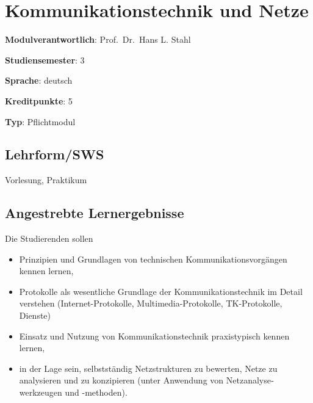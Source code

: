 \hypertarget{kommunikationstechnik-und-netzepathlabelmi-2017modulbeschreibungen-bachelorba_kommunikationstechnikundnetze}{%
\chapter{Kommunikationstechnik und
Netze\label{/mi-2017/modulbeschreibungen-bachelor/BA_KommunikationstechnikundNetze}}\label{kommunikationstechnik-und-netzepathlabelmi-2017modulbeschreibungen-bachelorba_kommunikationstechnikundnetze}}

\begin{modulHead}
\textbf{Modulverantwortlich}: Prof.~Dr.~Hans L.
Stahl
\end{modulHead}
\begin{modulHead}
\textbf{Studiensemester}:
3
\end{modulHead}
\begin{modulHead}
\textbf{Sprache}:
deutsch
\end{modulHead}
\begin{modulHead}
\textbf{Kreditpunkte}:
5
\end{modulHead}
\begin{modulHead}
\textbf{Typ}:
Pflichtmodul
\end{modulHead}


\hypertarget{lehrformswspathlabelmi-2017modulbeschreibungen-bachelorba_kommunikationstechnikundnetze}{%
\section*{Lehrform/SWS\label{/mi-2017/modulbeschreibungen-bachelor/BA_KommunikationstechnikundNetze}}\label{lehrformswspathlabelmi-2017modulbeschreibungen-bachelorba_kommunikationstechnikundnetze}}

Vorlesung, Praktikum

\hypertarget{angestrebte-lernergebnissepathlabelmi-2017modulbeschreibungen-bachelorba_kommunikationstechnikundnetze}{%
\section*{Angestrebte
Lernergebnisse\label{/mi-2017/modulbeschreibungen-bachelor/BA_KommunikationstechnikundNetze}}\label{angestrebte-lernergebnissepathlabelmi-2017modulbeschreibungen-bachelorba_kommunikationstechnikundnetze}}

Die Studierenden sollen

\begin{itemize}
\tightlist
\item
  Prinzipien und Grundlagen von technischen Kommunikations­vor­gängen
  kennen lernen,
\item
  Protokolle als wesentliche Grundlage der Kommunikationstechnik im
  Detail verstehen (Internet-Protokolle, Multimedia-Protokolle,
  TK-Protokolle, Dienste)
\item
  Einsatz und Nutzung von Kommunikations­tech­nik praxistypisch kennen
  lernen,
\item
  in der Lage sein, selbstständig Netzstrukturen zu bewerten, Netze zu
  analysieren und zu konzipieren (unter Anwendung von
  Netz­analyse­werkzeugen und -methoden).
\end{itemize}

